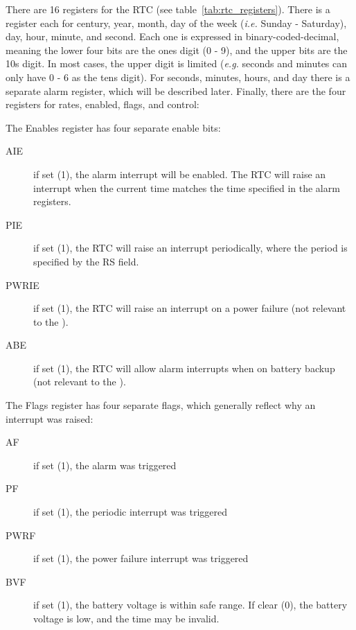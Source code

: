 There are 16 registers for the RTC (see table~\ref{tab:rtc_registers}). There is a register each for century, year, month, day of the week ({\it i.e.} Sunday - Saturday), day, hour, minute, and second. Each one is expressed in binary-coded-decimal, meaning the lower four bits are the ones digit (0 - 9), and the upper bits are the 10s digit. In most cases, the upper digit is limited ({\it e.g.} seconds and minutes can only have 0 - 6 as the tens digit). For seconds, minutes, hours, and day there is a separate alarm register, which will be described later. Finally, there are the four registers for rates, enabled, flags, and control:

The Enables register has four separate enable bits:
\begin{description}
    \item[AIE] if set (1), the alarm interrupt will be enabled. The RTC will raise an interrupt when the current time matches the time specified in the alarm registers.

    \item[PIE] if set (1), the RTC will raise an interrupt periodically, where the period is specified by the RS field.

    \item[PWRIE] if set (1), the RTC will raise an interrupt on a power failure (not relevant to the \jr).

    \item[ABE] if set (1), the RTC will allow alarm interrupts when on battery backup (not relevant to the \jr).
\end{description}

The Flags register has four separate flags, which generally reflect why an interrupt was raised:
\begin{description}
    \item[AF] if set (1), the alarm was triggered

    \item[PF] if set (1), the periodic interrupt was triggered

    \item[PWRF] if set (1), the power failure interrupt was triggered

    \item[BVF] if set (1), the battery voltage is within safe range. If clear (0), the battery voltage is low, and the time may be invalid.
\end{description}

